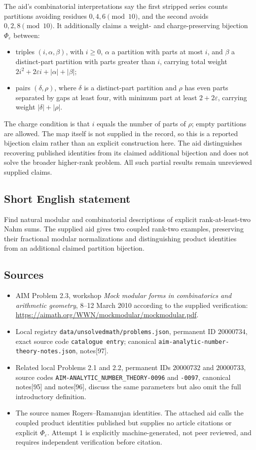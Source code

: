 \documentclass[11pt]{article}
\begin{document}
The aid's combinatorial interpretations say the first stripped series counts partitions avoiding residues \(0,4,6\pmod{10}\), and the second avoids \(0,2,8\pmod{10}\). It additionally claims a weight- and charge-preserving bijection \(\Phi_\varepsilon\) between:
\begin{itemize}
\item triples \((i,\alpha,\beta)\), with \(i\geq0\), \(\alpha\) a partition with parts at most \(i\), and \(\beta\) a distinct-part partition with parts greater than \(i\), carrying total weight \(2i^2+2\varepsilon i+|\alpha|+|\beta|\);
\item pairs \((\delta,\rho)\), where \(\delta\) is a distinct-part partition and \(\rho\) has even parts separated by gaps at least four, with minimum part at least \(2+2\varepsilon\), carrying weight \(|\delta|+|\rho|\).
\end{itemize}
The charge condition is that \(i\) equals the number of parts of \(\rho\); empty partitions are allowed. The map itself is not supplied in the record, so this is a reported bijection claim rather than an explicit construction here. The aid distinguishes recovering published identities from its claimed additional bijection and does not solve the broader higher-rank problem. All such partial results remain unreviewed supplied claims.
\subsection{Short English statement}
Find natural modular and combinatorial descriptions of explicit rank-at-least-two Nahm sums. The supplied aid gives two coupled rank-two examples, preserving their fractional modular normalizations and distinguishing product identities from an additional claimed partition bijection.
\subsection{Sources}
\begin{itemize}
\item AIM Problem 2.3, workshop \emph{Mock modular forms in combinatorics and arithmetic geometry}, 8--12 March 2010 according to the supplied verification: \url{https://aimath.org/WWN/mockmodular/mockmodular.pdf}.
\item Local registry \texttt{data/unsolvedmath/problems.json}, permanent ID \(20000734\), exact source code \texttt{catalogue entry}; canonical \texttt{aim-analytic-number-theory-notes.json}, notes[97].
\item Related local Problems 2.1 and 2.2, permanent IDs \(20000732\) and \(20000733\), source codes \texttt{AIM-ANALYTIC\_NUMBER\_THEORY-0096} and \texttt{-0097}, canonical notes[95] and notes[96], discuss the same parameters but also omit the full introductory definition.
\item The source names Rogers--Ramanujan identities. The attached aid calls the coupled product identities published but supplies no article citations or explicit \(\Phi_\varepsilon\). Attempt 1 is explicitly machine-generated, not peer reviewed, and requires independent verification before citation.
\end{itemize}
\end{document}
